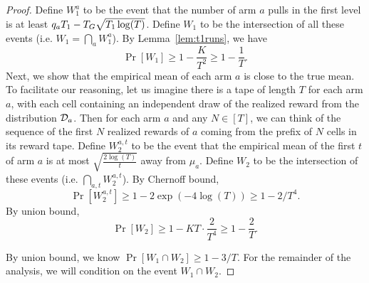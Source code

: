 \begin{proof}
  Define $W_1^a$ to be the event that the number of arm $a$ pulls in
  the first level is at least $q_a T_1- T_G \sqrt{T_1\log(T)}$.
Define $W_1$ to be the intersection of all these events (i.e. $W_1 = \bigcap_{a}W_1^a$). By Lemma~\ref{lem:t1runs}, we have
\[
\Pr[W_1] \geq 1- \frac{K}{T^2} \geq 1 - \frac{1}{T}.
\]
  Next, we show that the empirical mean of
each arm $a$ is close to the true mean. To facilitate our reasoning,
let us imagine there is a tape of length $T$ for each arm $a$, with
each cell containing an independent draw of the realized reward from
the distribution $\mathcal{D}_a$. Then for each arm $a$ and any $N\in [T]$, we
can think of the sequence of the first $N$ realized rewards of $a$
coming from the prefix of $N$ cells in its reward tape. Define
$W^{a,t}_2$ to be the event that the empirical mean of the first $t$
 of arm $a$ is at most
$\sqrt{\frac{2\log(T)}{t}}$ away from $\mu_a$. Define $W_2$ to be the
intersection of these events (i.e.  $\bigcap_{a,t} W^{a,t}_2$).  By
Chernoff bound,
\[
\Pr[W^{a,t}_2] \geq 1 - 2\exp(-4\log(T)) \geq 1-2/T^4.
\]
By union bound, 
\[
\Pr[W_2] \geq 1 - KT \cdot \frac{2}{T^4} \geq 1 - \frac{2}{T}.
\]



By union bound, we know $\Pr[W_1 \cap W_2] \geq 1 - 3/T$. For the
remainder of the analysis, we will condition on the event
$W_1 \cap W_2$.


\end{proof}
